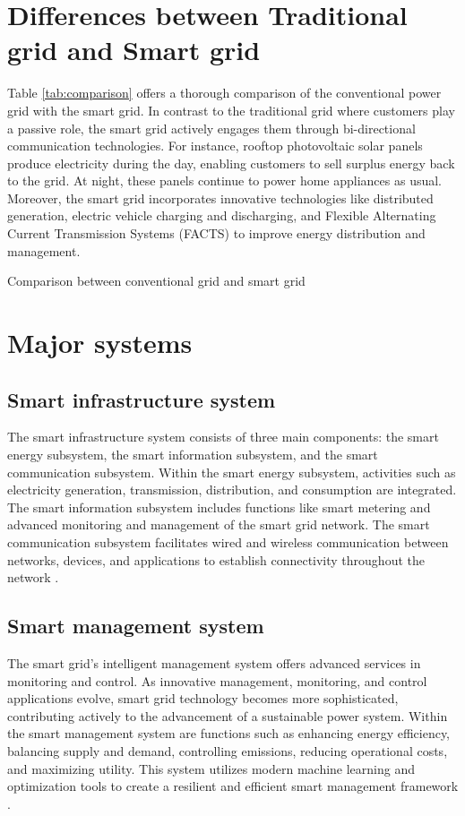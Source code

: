 \section{Differences between Traditional grid and Smart grid }
Table \ref{tab:comparison} offers a thorough comparison of the conventional power grid with the smart grid. In contrast to the traditional grid where customers play a passive role, the smart grid actively engages them through bi-directional communication technologies. For instance, rooftop photovoltaic solar panels produce electricity during the day, enabling customers to sell surplus energy back to the grid. At night, these panels continue to power home appliances as usual. Moreover, the smart grid incorporates innovative technologies like distributed generation, electric vehicle charging and discharging, and Flexible Alternating Current Transmission Systems (FACTS) to improve energy distribution and management.\cite{zhang2014smart}
\begin{table}[h]
  
	\caption{Comparison between conventional grid and smart grid \cite{miller2008understanding}}
    
	\label{tab:comparison}
\end{table}

\section{Major systems}


\subsection{Smart infrastructure system}
The smart infrastructure system consists of three main components: the smart energy subsystem, the smart information subsystem, and the smart communication subsystem. Within the smart energy subsystem, activities such as electricity generation, transmission, distribution, and consumption are integrated. The smart information subsystem includes functions like smart metering and advanced monitoring and management of the smart grid network. The smart communication subsystem facilitates wired and wireless communication between networks, devices, and applications to establish connectivity throughout the network \cite{shafiullah2013smart}.
\subsection{Smart management system}
The smart grid's intelligent management system offers advanced services in monitoring and control. As innovative management, monitoring, and control applications evolve, smart grid technology becomes more sophisticated, contributing actively to the advancement of a sustainable power system. Within the smart management system are functions such as enhancing energy efficiency, balancing supply and demand, controlling emissions, reducing operational costs, and maximizing utility. This system utilizes modern machine learning and optimization tools to create a resilient and efficient smart management framework \cite{shafiullah2013smart}.

